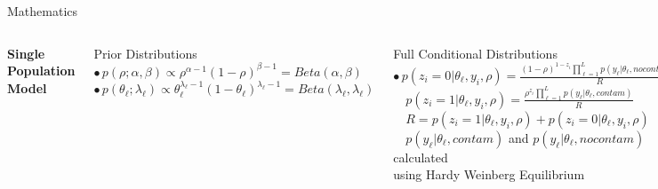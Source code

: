 \documentclass[letter,graphicx]{beamer}
\begin{document}
\begin{frame}{Mathematics}
\begin{tiny}
\begin{columns}[T]

\column{2.25in}
\centerline{\textbf{Single Population Model}}
\vspace{2mm}
Prior Distributions \\ \vspace{1mm}
$\bullet \, p(\rho;\alpha,\beta) \propto \rho^{\alpha - 1}(1 - \rho)^{\beta - 1} = Beta(\alpha, \beta)$ \\ \vspace{1mm}
$\bullet \, p(\theta_{\ell};\lambda_{\ell}) \propto \theta_{\ell}^{\lambda_{\ell}-1}(1 - \theta_{\ell})^{\lambda_{\ell}-1} = Beta(\lambda_{\ell},\lambda_{\ell})$ \\ 
\vspace{2mm}

Full Conditional Distributions \\ \vspace{1mm}
$\bullet \, p(z_i=0|\theta_{\ell},y_i,\rho) = \frac{(1-\rho)^{1-z_i}\prod_{\ell=1}^{L} p(y_{\ell}|\theta_{\ell},nocontam)}{R}$ \\ \vspace{1mm}
$\quad p(z_i=1|\theta_{\ell},y_i,\rho) = \frac{\rho^{z_i}\prod_{\ell=1}^{L} p(y_{\ell}|\theta_{\ell},contam)}{R}$ \\ \vspace{1mm}
$\quad R = p(z_i=1|\theta_{\ell},y_i,\rho) + p(z_i = 0|\theta_{\ell},y_i,\rho)$ \\ \vspace{1mm}
$\quad p(y_{\ell}|\theta_{\ell},contam)$ and $p(y_{\ell}|\theta_{\ell},nocontam)$ calculated  \\  \vspace{1mm}
\quad using Hardy Weinberg Equilibrium \\  \vspace{1mm}

$\bullet \, p(\rho|z_i) \propto Beta(\alpha + \sum_{i=1}^{N} z_i, \beta + N - \sum_{i=1}^{N} z_i)$ \\ \vspace{1mm}
$\bullet \,p(\theta_{\ell}|y_{i\ell},z_i) \propto Beta(2x_2 + x_1 + \lambda_{\ell}, 2x_0 + x_1 + \lambda_{\ell})$ \\ \vspace{1mm}
$\quad x_j = \sum_{i:z=0}^{N} \delta(y_{i\ell} = j)$\\


\end{columns}
\end{tiny}
\end{frame}
\end{document}
